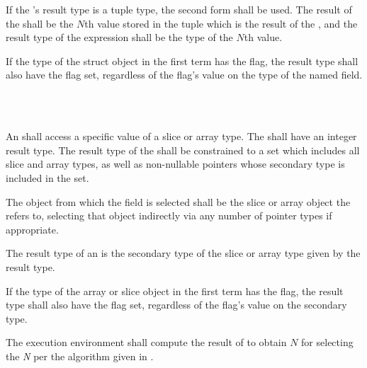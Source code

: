 \specsubsubitem
If the 's result type is a tuple type,
the second form shall be used. The result of the
 shall be the $N$th value stored in the
tuple which is the result of the , and the
result type of the expression shall be the type of the $N$th value.

\specsubsubitem
If the type of the struct object in the first term has the 
flag, the result type shall also have the  flag set, regardless
of the flag's value on the type of the named field.


\begin{grammar}
 \\
	 \terminal{[}  \terminal{]} \\
\end{grammar}

\specsubsubitem
An  shall access a specific value of a slice
or array type. The  shall have an integer result type.
The result type of the  shall be constrained to
a set which includes all slice and array types, as well as non-nullable pointers
whose secondary type is included in the set.


\specsubsubitem
The object from which the field is selected shall be the slice or array object
the  refers to, selecting that object indirectly
via any number of pointer types if appropriate.

\specsubsubitem
The result type of an  is the secondary type
of the slice or array type given by the  result
type.

\specsubsubitem
If the type of the array or slice object in the first term has the
 flag, the result type shall also have the 
flag set, regardless of the flag's value on the secondary type.

\specsubsubitem
The execution environment shall compute the result of
 to obtain $N$ for selecting the \textit{N} per the
algorithm given in .

